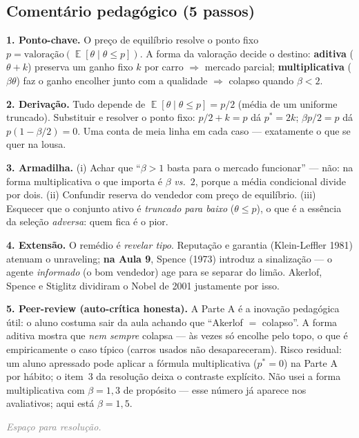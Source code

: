 \documentclass[11pt,a4paper]{article}
\DeclareMathOperator{\Esp}{\mathbb{E}}
\newcommand{\dc}[2]{#1{,}#2}
\newcommand{\passo}[1]{\smallskip\noindent\textbf{\textcolor{insper}{#1}}\quad}
\newcommand{\espacoaluno}[1]{%
  \par\smallskip\noindent\textit{\textcolor{gray}{Espaço para resolução.}}%
  \par\vspace{#1}\noindent\textcolor{insper!30}{\hrulefill}\par\medskip}
\begin{document}
\subsection*{Comentário pedagógico (5 passos)}
\begin{gabarito}
\passo{1. Ponto-chave.} O preço de equilíbrio resolve o ponto fixo
$p = \text{valoração}(\Esp[\theta\mid\theta\le p])$. A forma da valoração decide o
destino: \textbf{aditiva} ($\theta+k$) preserva um ganho fixo $k$ por carro $\Rightarrow$
mercado parcial; \textbf{multiplicativa} ($\beta\theta$) faz o ganho encolher junto com a
qualidade $\Rightarrow$ colapso quando $\beta<2$.

\passo{2. Derivação.} Tudo depende de $\Esp[\theta\mid\theta\le p]=p/2$ (média de um
uniforme truncado). Substituir e resolver o ponto fixo: $p/2+k=p$ dá $p^\ast=2k$;
$\beta p/2 = p$ dá $p(1-\beta/2)=0$. Uma conta de meia linha em cada caso — exatamente o
que se quer na lousa.

\passo{3. Armadilha.} (i) Achar que ``$\beta>1$ basta para o mercado funcionar'' — não:
na forma multiplicativa o que importa é $\beta$ \emph{vs.}~$2$, porque a média condicional
divide por dois. (ii) Confundir reserva do vendedor com preço de equilíbrio. (iii) Esquecer
que o conjunto ativo é \emph{truncado para baixo} ($\theta\le p$), o que é a essência da
seleção \emph{adversa}: quem fica é o pior.

\passo{4. Extensão.} O remédio é \emph{revelar tipo}. Reputação e garantia (Klein-Leffler
1981) atenuam o unraveling; \textbf{na Aula 9}, Spence (1973) introduz a sinalização — o
agente \emph{informado} (o bom vendedor) age para se separar do limão. Akerlof, Spence e
Stiglitz dividiram o Nobel de 2001 justamente por isso.

\passo{5. Peer-review (auto-crítica honesta).} A Parte A é a inovação pedagógica útil:
o aluno costuma sair da aula achando que ``Akerlof $=$ colapso''. A forma aditiva mostra
que \emph{nem sempre} colapsa — às vezes só encolhe pelo topo, o que é empiricamente o
caso típico (carros usados não desapareceram). Risco residual: um aluno apressado pode
aplicar a fórmula multiplicativa ($p^\ast=0$) na Parte A por hábito; o item~3 da resolução
deixa o contraste explícito. Não usei a forma multiplicativa com $\beta=\dc{1}{3}$ de
propósito — esse número já aparece nos avaliativos; aqui está $\beta=\dc{1}{5}$.
\end{gabarito}
\else
\espacoaluno{75mm}
\fi

\hrulefill

\end{document}
